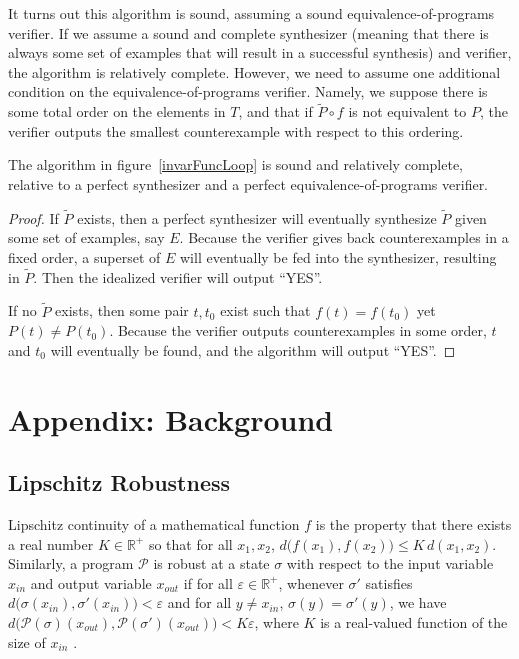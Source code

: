 \documentclass{llncs}
\begin{document}
  It turns out this algorithm is sound, assuming a sound equivalence-of-programs
  verifier.
  If we assume a sound and complete synthesizer (meaning that there is
  always some set of examples that will result in a successful synthesis)
  and verifier, the algorithm is relatively complete.
  However, we need to assume one additional condition on the
  equivalence-of-programs verifier.
  Namely, we suppose there is some total order on the elements in $T$,
  and that if $\widetilde{P}\circ f$ is not equivalent to $P$,
  the verifier outputs the smallest counterexample with respect to this
  ordering.

  \begin{theorem}
    The algorithm in figure~\ref{invarFuncLoop} is sound and relatively complete,
    relative to a perfect synthesizer and a perfect equivalence-of-programs
    verifier.
  \end{theorem}
  \begin{proof}

    If $\widetilde{P}$ exists, then a perfect synthesizer will eventually
    synthesize $\widetilde{P}$ given some set of examples, say $E$.
    Because the verifier gives back counterexamples in a fixed order,
    a superset of $E$ will eventually be fed into the synthesizer,
    resulting in $\widetilde{P}$.
    Then the idealized verifier will output ``YES''.

    If no $\widetilde{P}$ exists, then some pair $t, t_0$ exist
    such that $f(t)=f(t_0)$ yet $P(t)\ne P(t_0)$.
    Because the verifier outputs counterexamples in some order,
    $t$ and $t_0$ will eventually be found, and the algorithm will output ``YES''.
  \end{proof}

\appendix

\vspace{-0.1in}
\section{Appendix: Background}

  \subsection{Lipschitz Robustness}

    Lipschitz continuity of a mathematical function \(f\) is the property that there
    exists a real number \(K \in \mathbb{R}^{+}\) so that for all \(x_{1}, x_{2}\),
    \(d\big(f(x_{1}), f(x_{2})\big) \leq K\,d(x_{1}, x_{2})\).  Similarly, a program
    \(\mathcal{P}\) is robust at a state \(\sigma\)  with respect to the input
    variable \(x_{in}\) and output variable \(x_{out}\) if for all \(\varepsilon \in
    \mathbb{R}^{+}\), whenever \(\sigma'\) satisfies
    \(d\big(\sigma(x_{in}), \sigma'(x_{in})\big) < \varepsilon\) and
    for all \(y \not= x_{in}\), \(\sigma(y) = \sigma'(y)\),
    we have \(d\big(\mathcal{P}(\sigma)(x_{out}), \mathcal{P}(\sigma')(x_{out})\big) < K\varepsilon\),
    where \(K\) is a real-valued function of the size of \(x_{in}\)
    \cite{chaudhuri11}.
\end{document}
